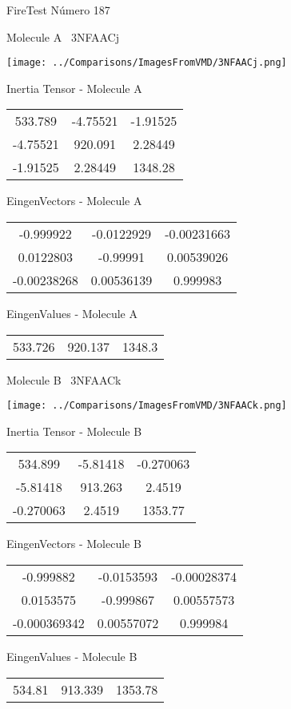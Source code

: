 \vtab[-3cm]
\begin{center}
{\large FireTest \tab Número 187}
\end{center}
\begin{multicols}{2}
\begin{center}

Molecule A \
3NFAACj

\texttt{[image: ../Comparisons/ImagesFromVMD/3NFAACj.png]}

Inertia Tensor - Molecule A \\
\begin{tabular}{|c c c|}
533.789	 & 	-4.75521	 & 	-1.91525	 \\
-4.75521	 & 	920.091	 & 	2.28449	 \\
-1.91525	 & 	2.28449	 & 	1348.28
\end{tabular}

\vtab
 EingenVectors - Molecule A     \\
\begin{tabular}{|c c c|}
-0.999922	 & 	-0.0122929	 & 	-0.00231663	 \\
0.0122803	 & 	-0.99991	 & 	0.00539026	 \\
-0.00238268	 & 	0.00536139	 & 	0.999983
\end{tabular}

\vtab
 EingenValues - Molecule A     \\
\begin{tabular}{|c c c|}
533.726	 & 	920.137	 & 	1348.3	 \\
\end{tabular}
\columnbreak

Molecule B \
3NFAACk

\texttt{[image: ../Comparisons/ImagesFromVMD/3NFAACk.png]}

Inertia Tensor - Molecule B \\
\begin{tabular}{|c c c|}
534.899	 & 	-5.81418	 & 	-0.270063	 \\
-5.81418	 & 	913.263	 & 	2.4519	 \\
-0.270063	 & 	2.4519	 & 	1353.77
\end{tabular}

\vtab
 EingenVectors - Molecule B     \\
\begin{tabular}{|c c c|}
-0.999882	 & 	-0.0153593	 & 	-0.00028374	 \\
0.0153575	 & 	-0.999867	 & 	0.00557573	 \\
-0.000369342	 & 	0.00557072	 & 	0.999984
\end{tabular}

\vtab
 EingenValues - Molecule B     \\
\begin{tabular}{|c c c|}
534.81	 & 	913.339	 & 	1353.78	 \\
\end{tabular}

\end{center}
\end{multicols}

